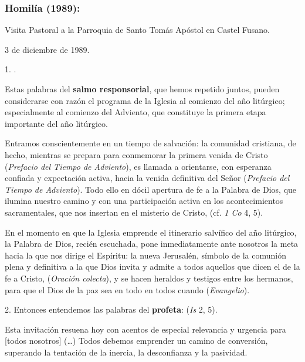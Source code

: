 \subsubsection{Homilía (1989):} Visita Pastoral a la Parroquia de Santo Tomás Apóstol en Castel Fusano.

3 de diciembre de 1989.

\begin{body}
	1. .

	Estas palabras del \textbf{salmo responsorial}, que hemos repetido juntos, pueden considerarse con razón el programa de la Iglesia al comienzo del año litúrgico; especialmente al comienzo del Adviento, que constituye la primera etapa importante del año litúrgico.

	Entramos conscientemente en un tiempo  de salvación: la comunidad cristiana, de hecho, mientras se prepara para conmemorar la primera venida de Cristo  (\emph{Prefacio del Tiempo de Adviento}), es llamada a orientarse, con esperanza confiada y expectación activa, hacia la venida definitiva del Señor  (\emph{Prefacio del Tiempo de Adviento}). Todo ello en dócil apertura de fe a la Palabra de Dios, que ilumina nuestro camino y con una participación activa en los acontecimientos sacramentales, que nos insertan en el misterio de Cristo,  (cf. \emph{1 Co} 4, 5).

	En el momento en que la Iglesia emprende el itinerario salvífico del año litúrgico, la Palabra de Dios, recién escuchada, pone inmediatamente ante nosotros la meta hacia la que nos dirige el Espíritu: la nueva Jerusalén, símbolo de la comunión plena y definitiva a la que Dios invita y admite a todos aquellos que dicen el  de la fe a Cristo,  (\emph{Oración colecta}), y se hacen heraldos y testigos entre los hermanos, para que el Dios de la paz sea en todo en todos cuando  (\emph{Evangelio}).

	2. Entonces entendemos las palabras del \textbf{profeta}:  (\emph{Is} 2, 5).

	Esta invitación resuena hoy con acentos de especial relevancia y urgencia para {[}todos nosotros{]} (\ldots{}) Todos debemos emprender un camino de conversión, superando la tentación de la inercia, la desconfianza y la pasividad.


\end{body}
